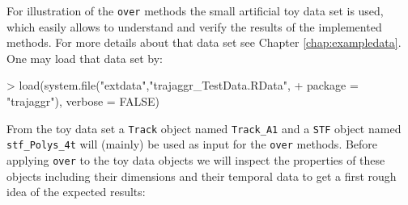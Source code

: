 \documentclass[12pt, oneside, a4paper]{scrbook}
\let\code=\texttt
\begin{document}
For illustration of the \code{over} methods the small artificial toy data set is used, which easily allows to understand and verify the results of the implemented methods. 
For more details about that data set see Chapter \ref{chap:exampledata}. One may load that data set by:

\begin{small}
\begin{Schunk}
\begin{Sinput}
> load(system.file("extdata","trajaggr_TestData.RData", 
+                  package = "trajaggr"), verbose = FALSE)
\end{Sinput}
\end{Schunk}
\end{small}

From the toy data set a \code{Track} object named \code{Track\_A1} and a \code{STF} object named \code{stf\_Polys\_4t} will (mainly) be used as input for the \code{over} methods.
Before applying \code{over} to the toy data objects we will inspect the properties of these objects including their dimensions and their temporal data to get a first rough idea of the expected results:
\end{document}
